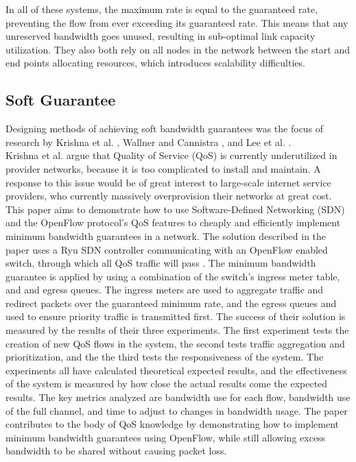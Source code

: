 \documentclass[accepted,single]{gipaper}
\begin{document}
\hspace{10mm} In all of these systems, the maximum rate is equal to the guaranteed rate, preventing the flow from ever exceeding its guaranteed rate. This means that any unreserved bandwidth goes unused, resulting in sub-optimal link capacity utilization. They also both rely on all nodes in the network between the start and end points allocating resources, which introduces scalability difficulties.

\subsection{Soft Guarantee}
\label{soft_qos}

Designing methods of achieving soft bandwidth guarantees was the focus of research by Krishna et al. \cite{Krishna:2016}, Wallner and Cannistra \cite{Wallner:2013}, and Lee et al. \cite{SWLee}.
\\


\hspace{10mm} Krishna et al. \cite{Krishna:2016} argue that Quality of Service (QoS) is currently underutilized in provider networks, because it is too complicated to install and maintain. A response to this issue would be of great interest to large-scale internet service providers, who currently massively overprovision their networks at great cost. This paper aims to demonstrate how to use Software-Defined Networking (SDN) and the OpenFlow protocol’s QoS features to cheaply and efficiently implement minimum bandwidth guarantees in a network. The solution described in the paper uses a Ryu SDN controller communicating with an OpenFlow enabled switch, through which all QoS traffic will pass \cite{Krishna:2016}. The minimum bandwidth guarantee is applied by using a combination of the switch’s ingress meter table, and and egress queues. The ingress meters are used to aggregate traffic and redirect packets over the guaranteed minimum rate, and the egress queues and used to ensure priority traffic is transmitted first. The success of their solution is measured by the results of their three experiments. The first experiment tests the creation of new QoS flows in the system, the second tests traffic aggregation and prioritization, and the the third tests the responsiveness of the system. The experiments all have calculated theoretical expected results, and the effectiveness of the system is measured by how close the actual results come the expected results. The key metrics analyzed are bandwidth use for each flow, bandwidth use of the full channel, and time to adjust to changes in bandwidth usage. The paper contributes to the body of QoS knowledge by demonstrating how to implement minimum bandwidth guarantees using OpenFlow, while still allowing excess bandwidth to be shared without causing packet loss.
\end{document}
